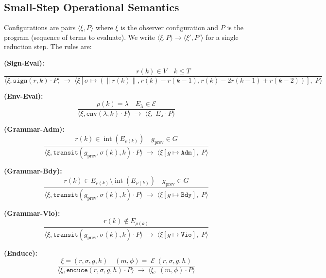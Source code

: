 \documentclass[11pt,a4paper]{article}
\theoremstyle{plain}
\theoremstyle{definition}
\theoremstyle{remark}
\DeclareMathOperator{\Endo}{\mathcal{E}}
\DeclareMathOperator{\interior}{int}
\newcommand{\norm}[1]{\left\|#1\right\|}
\begin{document}
\subsection{Small-Step Operational Semantics}
\label{sec:sos}

Configurations are pairs $\langle \xi, P \rangle$ where $\xi$ is the observer configuration and
$P$ is the program (sequence of terms to evaluate). We write $\langle \xi, P \rangle \to
\langle \xi', P' \rangle$ for a single reduction step. The rules are:

\vspace{0.5em}
\noindent\textbf{(Sign-Eval):}
\begin{equation}
  \frac{r(k) \in V \quad k \leq T}
       {\langle \xi, \mathtt{sign}(r,k) \cdot P \rangle \;\to\;
        \langle \xi[\sigma \mapsto (\norm{r(k)}, r(k)-r(k-1), r(k)-2r(k-1)+r(k-2))],\; P \rangle}
\end{equation}

\noindent\textbf{(Env-Eval):}
\begin{equation}
  \frac{\rho(k) = \lambda \quad E_\lambda \in \mathcal{E}}
       {\langle \xi, \mathtt{env}(\lambda,k) \cdot P \rangle \;\to\;
        \langle \xi,\; E_\lambda \cdot P \rangle}
\end{equation}

\noindent\textbf{(Grammar-Adm):}
\begin{equation}
  \frac{r(k) \in \interior(E_{\rho(k)}) \quad g_{\text{prev}} \in G}
       {\langle \xi, \mathtt{transit}(g_{\text{prev}}, \sigma(k), k) \cdot P \rangle \;\to\;
        \langle \xi[g \mapsto \mathtt{Adm}],\; P \rangle}
\end{equation}

\noindent\textbf{(Grammar-Bdy):}
\begin{equation}
  \frac{r(k) \in E_{\rho(k)} \setminus \interior(E_{\rho(k)}) \quad g_{\text{prev}} \in G}
       {\langle \xi, \mathtt{transit}(g_{\text{prev}}, \sigma(k), k) \cdot P \rangle \;\to\;
        \langle \xi[g \mapsto \mathtt{Bdy}],\; P \rangle}
\end{equation}

\noindent\textbf{(Grammar-Vio):}
\begin{equation}
  \frac{r(k) \notin E_{\rho(k)}}
       {\langle \xi, \mathtt{transit}(g_{\text{prev}}, \sigma(k), k) \cdot P \rangle \;\to\;
        \langle \xi[g \mapsto \mathtt{Vio}],\; P \rangle}
\end{equation}

\noindent\textbf{(Enduce):}
\begin{equation}
  \frac{\xi = (r, \sigma, g, h) \quad (m, \phi) = \Endo(r, \sigma, g, h)}
       {\langle \xi, \mathtt{enduce}(r,\sigma,g,h) \cdot P \rangle \;\to\;
        \langle \xi,\; (m, \phi) \cdot P \rangle}
\end{equation}
\end{document}
